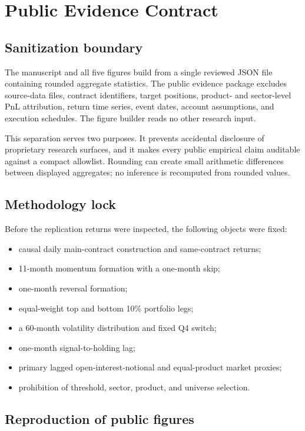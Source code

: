 \section{Public Evidence Contract}

\subsection{Sanitization boundary}

The manuscript and all five figures build from a single reviewed JSON file containing
rounded aggregate statistics. The public evidence package excludes source-data files,
contract identifiers, target positions, product- and sector-level PnL attribution,
return time series, event dates, account assumptions, and execution schedules. The
figure builder reads no other research input.

This separation serves two purposes. It prevents accidental disclosure of proprietary
research surfaces, and it makes every public empirical claim auditable against a compact
allowlist. Rounding can create small arithmetic differences between displayed aggregates;
no inference is recomputed from rounded values.

\subsection{Methodology lock}

Before the replication returns were inspected, the following objects were fixed:

\begin{itemize}
  \item causal daily main-contract construction and same-contract returns;
  \item 11-month momentum formation with a one-month skip;
  \item one-month reversal formation;
  \item equal-weight top and bottom 10\% portfolio legs;
  \item a 60-month volatility distribution and fixed Q4 switch;
  \item one-month signal-to-holding lag;
  \item primary lagged open-interest-notional and equal-product market proxies;
  \item prohibition of threshold, sector, product, and universe selection.
\end{itemize}

\subsection{Reproduction of public figures}

